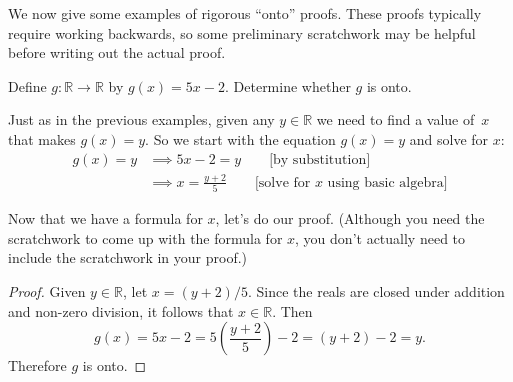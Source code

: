 We now give some examples of rigorous ``onto'' proofs. These proofs typically require working backwards, so some preliminary scratchwork may be helpful before writing out the actual proof.

\begin{example}{}
Define $g \colon \mathbb{R} \to \mathbb{R}$ by $g(x) = 5x - 2$. Determine whether $g$ is onto.

\begin{scratchwork} Just as in the previous examples, given any $y \in \mathbb{R}$  we need to find a value of~$x$ that makes $g(x) = y$. So we start with the equation $g(x) = y$ and solve for $x$:
\begin{align*}
g(x) = y  &\implies 5x-2 = y \qquad \text{[by substitution]}\\
 & \implies x = \frac{y+2}{5}\qquad \text{[solve for $x$ using basic algebra]}
\end{align*} 
\end{scratchwork}

\noindent
Now that we have a formula for $x$, let's do our proof. (Although you need the scratchwork to come up with the formula for $x$, you don't actually need to include the scratchwork in your proof.)

\begin{proof} 
Given $y \in \mathbb{R}$, let $x = (y+2)/5$.  Since the reals are closed under addition and non-zero division, it follows that $x \in \mathbb{R}$. Then
\[ g(x) = 5x - 2 = 5 \left( \frac{y+2}{5} \right) - 2 = (y+2) - 2 = y . \]
Therefore $g$ is onto.
\end{proof}

\end{example}


